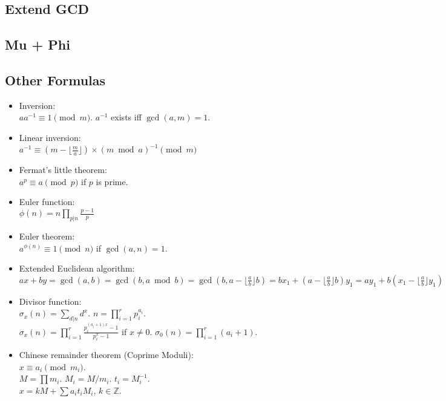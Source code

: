\documentclass[a4paper,10pt,twocolumn,oneside]{article}
\begin{document}
\subsection{Extend GCD}


\subsection{Mu + Phi}



\subsection{Other Formulas}
{\normalsize \begin{itemize}
    \item Inversion:\\ $aa^{-1} \equiv 1 \pmod{m}$. $a^{-1}$ exists iff $\gcd(a,m)=1$.
    
    \item Linear inversion:\\ $a^{-1} \equiv (m - \lfloor\frac{m}{a}\rfloor) \times (m \bmod a)^{-1} \pmod{m}$
    
    \item Fermat's little theorem:\\ $a^p \equiv a \pmod{p}$ if $p$ is prime.
    
    \item Euler function:\\ $\phi(n)=n \prod_{p|n} \frac{p-1}{p}$
    
    \item Euler theorem:\\ $a^{\phi(n)} \equiv 1 \pmod{n}$ if $\gcd(a,n) = 1$.
    
    \item Extended Euclidean algorithm:\\
    $ax+by=\gcd(a,b)=\gcd(b, a \bmod b)=\gcd(b, a-\lfloor\frac{a}{b}\rfloor b)=bx_1+(a-\lfloor\frac{a}{b}\rfloor b)y_1=ay_1+b(x_1-\lfloor\frac{a}{b}\rfloor y_1)$
    
    \item Divisor function:\\ $\sigma_x(n) = \sum_{d|n}d^x$. $n=\prod_{i=1}^r p_i^{a_i}$.\\ $\sigma_x(n)=\prod_{i=1}^r \frac{p_i^{(a_i+1)x}-1}{p_i^x-1}$ if $x \neq 0$. $\sigma_0(n)=\prod_{i=1}^r (a_i+1)$.
    
    \item Chinese remainder theorem (Coprime Moduli):\\ $x \equiv a_i \pmod{m_i}$.\\
        $M=\prod m_i$. $M_i=M/m_i$. $t_i=M_i^{-1}$.\\
        $x = kM + \sum a_i t_i M_i$, $k \in \mathbb{Z}$.
        

\end{itemize}}
\end{document}
